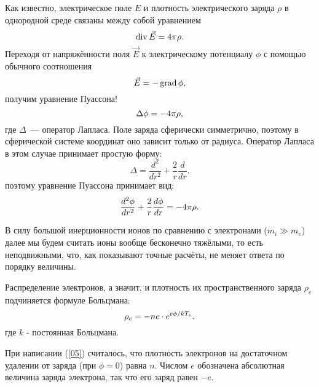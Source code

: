 Как известно, электрическое поле $E$ и плотность электрического заряда $\rho$ в однородной среде связаны между собой
уравнением
\begin{equation}
	\eqmark{01}
	\Div \vec{E}=4\pi\rho.
\end{equation}
Переходя от напряжённости поля $\vec{E}$ к электрическому потенциалу $\phi$ с помощью обычного соотношения
\begin{equation}
	\eqmark{02}
	\vec{E}=-\Grad\phi,
\end{equation}
получим уравнение Пуассона!
\begin{equation}
	\eqmark{03}
	\Delta\phi=-4\pi\rho,
\end{equation}
где $\Delta$~--- оператор Лапласа. Поле заряда сферически симметрично, поэтому в сферической системе координат оно зависит
только от радиуса. Оператор Лапласа в этом случае принимает простую форму:
\begin{equation*}
	\Delta=\frac{d^2}{dr^2}+\frac{2}{r}\frac{d}{dr}.
\end{equation*}
поэтому уравнение Пуассона принимает вид:
\begin{equation}
	\eqmark{04}
	\frac{d^2\phi}{dr^2}+\frac{2}{r}\frac{d\phi}{dr}=-4\pi\rho.
\end{equation}

В силу большой инерционности ионов по сравнению с электронами ($m_i\gg m_e$) далее мы будем считать ионы вообще бесконечно
тяжёлыми, то есть неподвижными, что, как показывают точные расчёты, не меняет ответа по порядку величины.

Распределение электронов, а значит, и плотность их пространственного заряда $\rho_e$ подчиняется формуле Больцмана:
\begin{equation}
	\eqmark{05}
	\rho_e=-ne\cdot e^{e\phi/kT_e}.
\end{equation}
где $k$ - постоянная Больцмана.

При написании (\eqref{05}) считалось, что плотность электронов на достаточном удалении от заряда (при $\phi=0$) равна $n$.
Числом $e$ обозначена абсолютная величина заряда электрона, так что его заряд равен $-e$.

